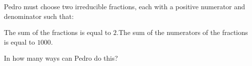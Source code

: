 Pedro must choose two irreducible fractions, each with a positive numerator and denominator such that:

The sum of the fractions is equal to $2$.The sum of the numerators of the fractions is equal to $1000$.

In how many ways can Pedro do this?